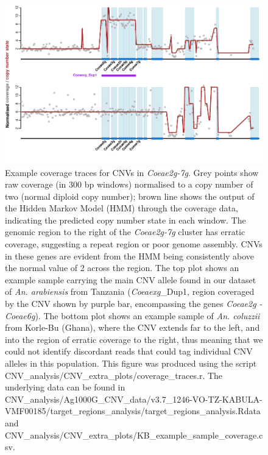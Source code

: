 \documentclass[a4paper,12pt]{article}
\begin{document}
\begin{figure}[h]
	\begin{center}
		\includegraphics*[width = 15cm]{../../CNV_analysis/CNV_extra_plots/example_plots_modified.pdf}
		\caption{\footnotesize Example coverage traces for CNVs in \textit{Coeae2g-7g}. Grey points show raw coverage (in 300 bp windows) normalised to a copy number of two (normal diploid copy number); brown line shows the output of the Hidden Markov Model (HMM) through the coverage data, indicating the predicted copy number state in each window. The genomic region to the right of the \textit{Coeae2g-7g} cluster has erratic coverage, suggesting a repeat region or poor genome assembly. CNVs in these genes are evident from the HMM being consistently above the normal value of 2 across the region. The top plot shows an example sample carrying the main CNV allele found in our dataset of \textit{An. arabiensis} from Tanzania (\textit{Coeaexg}\_Dup1, region coveraged by the CNV shown by purple bar, encompassing the genes \textit{Coeae2g - Coeae6g}). The bottom plot shows an example sample of \textit{An. coluzzii} from Korle-Bu (Ghana), where the CNV extends far to the left, and into the region of erratic coverage to the right, thus meaning that we could not identify discordant reads that could tag individual CNV alleles in this population. This figure was produced using the script CNV\_analysis/CNV\_extra\_plots/coverage\_traces.r. The underlying data can be found in CNV\_analysis/Ag1000G\_CNV\_data/v3.7\_1246-VO-TZ-KABULA-VMF00185/target\_regions\_analysis/target\_regions\_analysis.Rdata and CNV\_analysis/CNV\_extra\_plots/KB\_example\_sample\_coverage.csv.}
	\end{center}
	\label{FigS7}
\end{figure}
 
\end{document}
